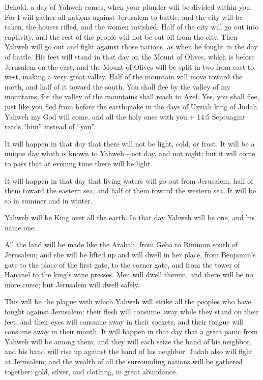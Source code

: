  Behold, a day of Yahweh comes, when your plunder will be
divided within you.  For I will gather all nations against
Jerusalem to battle; and the city will be taken, the houses rifled, and
the women ravished. Half of the city will go out into captivity, and the
rest of the people will not be cut off from the city.  Then
Yahweh will go out and fight against those nations, as when he fought in
the day of battle.  His feet will stand in that day on the
Mount of Olives, which is before Jerusalem on the east; and the Mount of
Olives will be split in two from east to west, making a very great
valley. Half of the mountain will move toward the north, and half of it
toward the south.  You shall flee by the valley of my
mountains, for the valley of the mountains shall reach to Azel. Yes, you
shall flee, just like you fled from before the earthquake in the days of
Uzziah king of Judah. Yahweh my God will come, and all the holy ones
with you.+ 14:5 Septuagint reads ``him'' instead of ``you''.

 It will happen in that day that there will not be light,
cold, or frost.  It will be a unique day which is known to
Yahweh---not day, and not night; but it will come to pass that at
evening time there will be light.

 It will happen in that day that living waters will go out
from Jerusalem, half of them toward the eastern sea, and half of them
toward the western sea. It will be so in summer and in winter.

 Yahweh will be King over all the earth. In that day Yahweh
will be one, and his name one.

 All the land will be made like the Arabah, from Geba to
Rimmon south of Jerusalem; and she will be lifted up and will dwell in
her place, from Benjamin's gate to the place of the first gate, to the
corner gate, and from the tower of Hananel to the king's wine presses.
 Men will dwell therein, and there will be no more curse;
but Jerusalem will dwell safely.

 This will be the plague with which Yahweh will strike all
the peoples who have fought against Jerusalem: their flesh will consume
away while they stand on their feet, and their eyes will consume away in
their sockets, and their tongue will consume away in their mouth.
 It will happen in that day that a great panic from Yahweh
will be among them; and they will each seize the hand of his neighbor,
and his hand will rise up against the hand of his neighbor.
 Judah also will fight at Jerusalem; and the wealth of all
the surrounding nations will be gathered together: gold, silver, and
clothing, in great abundance.


